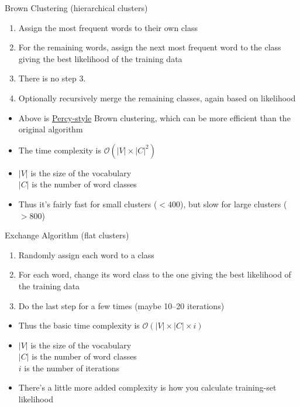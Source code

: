 \documentclass[xcolor=pdftex,x11names,table,hyperref]{beamer}
\begin{document}
\begin{frame}{Brown Clustering (hierarchical clusters)}
\begin{enumerate}
	\item Assign the most frequent words to their own class
	\pause
	\item For the remaining words, assign the next most frequent word to the class giving the best likelihood of the training data
	\pause
	\item There is no step 3.
	\pause
	\item Optionally recursively merge the remaining classes, again based on likelihood
\end{enumerate}
\pause
\begin{itemize}
	\item Above is \href{http://people.csail.mit.edu/pliang/papers/meng-thesis.pdf}{Percy-style} Brown clustering, which can be more efficient than the original algorithm
	\pause
	\item The time complexity is $\mathcal{O}( |V| \times |C|^2 )$
	\item $|V|$ is the size of the vocabulary \\
	      $|C|$ is the number of word classes \\
	\pause
	\item Thus it's fairly fast for small clusters ($<400$), but slow for large clusters ($>800$)
\end{itemize}
\end{frame}

\begin{frame}{Exchange Algorithm (flat clusters)}
\begin{enumerate}
	\item Randomly assign each word to a class
	\pause
	\item For each word, change its word class to the one giving the best likelihood of the training data
	\pause
	\item Do the last step for a few times (maybe 10--20 iterations)
\end{enumerate}
\pause
\begin{itemize}
	\item Thus the basic time complexity is $\mathcal{O}(|V| \times |C| \times i)$
	\item $|V|$ is the size of the vocabulary \\
	      $|C|$ is the number of word classes \\
	      $i$ is the number of iterations
\pause
	\item There's a little more added complexity is how you calculate training-set likelihood
\end{itemize}
\end{frame}
\end{document}
